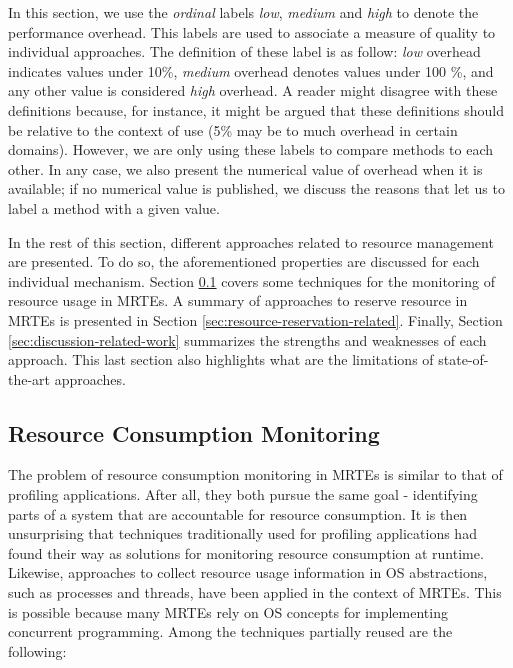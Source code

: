 \begin{itemize}
In this section, we use the \textit{ordinal} labels \textit{low}, \textit{medium} and \textit{high} to denote the performance overhead.
This labels are used to associate a measure of quality to individual approaches. 
The definition of these label is as follow: \textit{low} overhead indicates values under 10\%, \textit{medium} overhead denotes values under 100 \%, and any other value is considered \textit{high} overhead.
A reader might disagree with these definitions because, for instance, it might be argued that these definitions should be relative to the context of use (5\% may be to much overhead in certain domains).
However, we are only using these labels to compare methods to each other.
In any case, we also present the numerical value of overhead when it is available; if no numerical value is published, we discuss the reasons that let us to label a method with a given value.
\end{itemize}

In the rest of this section, different approaches related to resource management are presented.
To do so, the aforementioned properties are discussed for each individual mechanism.
Section \ref{sec:resource-consumption-monitoring-related} covers some techniques for the monitoring of resource usage in MRTEs.
A summary of approaches to reserve resource in MRTEs is presented in Section \ref{sec:resource-reservation-related}.
Finally, Section \ref{sec:discussion-related-work} summarizes the strengths and weaknesses of each approach.
This last section also highlights what are the limitations of state-of-the-art approaches.

\subsection{Resource Consumption Monitoring} \label{sec:resource-consumption-monitoring-related}

The problem of resource consumption monitoring in MRTEs is similar to that of profiling applications.
After all, they both pursue the same goal - identifying parts of a system that are accountable for resource consumption.
It is then unsurprising that techniques traditionally used for profiling applications had found their way as solutions for monitoring resource consumption at runtime.
Likewise, approaches to collect resource usage information in OS abstractions, such as processes and threads, have been applied in the context of MRTEs.
This is possible because many MRTEs rely on OS concepts for implementing concurrent programming.
Among the techniques partially reused are the following:

